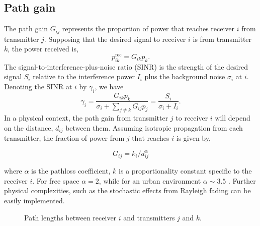 \documentclass[twocolumn,secnumarabic,amssymb, nobibnotes, aps, prl,superscriptaddress]{revtex4-1}
\begin{document}
\subsection{Path gain}
The path gain $G_{ij}$ represents the proportion of power that reaches receiver $i$ from transmitter $j$. Supposing that the desired signal to receiver $i$ is from transmitter $k$, the power received is,
\begin{equation}
p_{ik}^{\text{rec}} = G_{ik}p_k.
\end{equation}
The signal-to-interference-plus-noise ratio (SINR) is the strength of the desired signal $S_i$ relative to the interference power $I_i$ plus the background noise $\sigma_i$ at $i$. Denoting the SINR at $i$ by $\gamma_i$, we have
\begin{equation}
\gamma_i = \frac{G_{ik}p_k}{\sigma_i+\sum_{j\neq k}G_{ij}p_j}
=\frac{S_i}{\sigma_i+I_i}.
\end{equation}
In a physical context, the path gain from transmitter $j$ to receiver $i$ will depend on the distance, $d_{ij}$ between them.  Assuming isotropic propagation from each transmitter, the fraction of power from $j$ that reaches $i$ is given by,

\begin{equation}
G_{ij} = k_i/d_{ij}^\alpha
\end{equation}

where $\alpha$ is the pathloss coefficient, $k$ is a proportionality constant specific to the receiver $i$.  For free space $\alpha = 2$, while for an urban environment $\alpha \sim 3.5$ \cite{hata1980}.  Further physical complexities, such as the stochastic effects from Rayleigh fading can be easily implemented.

\begin{figure}[H]
\centering
{}
\caption{Path lengths between receiver $i$ and transmitters $j$ and $k$.}\label{fig:spatial_diagram}
\end{figure}
\end{document}
